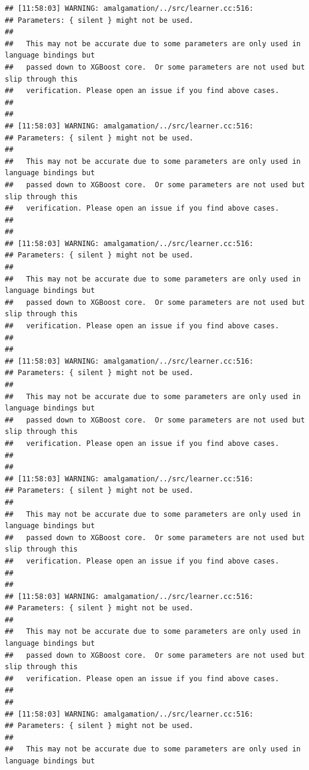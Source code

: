 \documentclass[AMS,STIX2COL]{WileyNJD-v2}\usepackage[]{graphicx}\usepackage[]{color}
\makeatletter
\newenvironment{kframe}{%
 \def\at@end@of@kframe{}%
 \ifinner\ifhmode%
  \def\at@end@of@kframe{\end{minipage}}%
  \begin{minipage}{\columnwidth}%
 \fi\fi%
 \def\FrameCommand##1{\hskip\@totalleftmargin \hskip-\fboxsep
 \colorbox{shadecolor}{##1}\hskip-\fboxsep
     \hskip-\linewidth \hskip-\@totalleftmargin \hskip\columnwidth}%
 \MakeFramed {\advance\hsize-\width
   \@totalleftmargin\z@ \linewidth\hsize
   \@setminipage}}%
 {\par\unskip\endMakeFramed%
 \at@end@of@kframe}
\newenvironment{knitrout}{}{} %
\makeatother
\begin{document}
\begin{knitrout}
\color{fgcolor}\begin{kframe}
\begin{verbatim}
## [11:58:03] WARNING: amalgamation/../src/learner.cc:516: 
## Parameters: { silent } might not be used.
## 
##   This may not be accurate due to some parameters are only used in language bindings but
##   passed down to XGBoost core.  Or some parameters are not used but slip through this
##   verification. Please open an issue if you find above cases.
## 
## 
## [11:58:03] WARNING: amalgamation/../src/learner.cc:516: 
## Parameters: { silent } might not be used.
## 
##   This may not be accurate due to some parameters are only used in language bindings but
##   passed down to XGBoost core.  Or some parameters are not used but slip through this
##   verification. Please open an issue if you find above cases.
## 
## 
## [11:58:03] WARNING: amalgamation/../src/learner.cc:516: 
## Parameters: { silent } might not be used.
## 
##   This may not be accurate due to some parameters are only used in language bindings but
##   passed down to XGBoost core.  Or some parameters are not used but slip through this
##   verification. Please open an issue if you find above cases.
## 
## 
## [11:58:03] WARNING: amalgamation/../src/learner.cc:516: 
## Parameters: { silent } might not be used.
## 
##   This may not be accurate due to some parameters are only used in language bindings but
##   passed down to XGBoost core.  Or some parameters are not used but slip through this
##   verification. Please open an issue if you find above cases.
## 
## 
## [11:58:03] WARNING: amalgamation/../src/learner.cc:516: 
## Parameters: { silent } might not be used.
## 
##   This may not be accurate due to some parameters are only used in language bindings but
##   passed down to XGBoost core.  Or some parameters are not used but slip through this
##   verification. Please open an issue if you find above cases.
## 
## 
## [11:58:03] WARNING: amalgamation/../src/learner.cc:516: 
## Parameters: { silent } might not be used.
## 
##   This may not be accurate due to some parameters are only used in language bindings but
##   passed down to XGBoost core.  Or some parameters are not used but slip through this
##   verification. Please open an issue if you find above cases.
## 
## 
## [11:58:03] WARNING: amalgamation/../src/learner.cc:516: 
## Parameters: { silent } might not be used.
## 
##   This may not be accurate due to some parameters are only used in language bindings but

\end{verbatim}
\end{kframe}
\end{knitrout}
\end{document}
